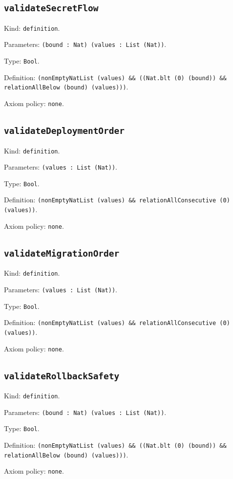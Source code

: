 \documentclass[11pt]{article}
\begin{document}
\subsection*{\texttt{validateSecretFlow}}
\noindent Kind: \texttt{definition}.\par
\noindent Parameters: \texttt{(bound : Nat) (values : List (Nat))}.\par
\noindent Type: \texttt{Bool}.\par
\noindent Definition: \texttt{(nonEmptyNatList (values) \&\& ((Nat.blt (0) (bound)) \&\& relationAllBelow (bound) (values)))}.\par
\noindent Axiom policy: \texttt{none}.\par
\subsection*{\texttt{validateDeploymentOrder}}
\noindent Kind: \texttt{definition}.\par
\noindent Parameters: \texttt{(values : List (Nat))}.\par
\noindent Type: \texttt{Bool}.\par
\noindent Definition: \texttt{(nonEmptyNatList (values) \&\& relationAllConsecutive (0) (values))}.\par
\noindent Axiom policy: \texttt{none}.\par
\subsection*{\texttt{validateMigrationOrder}}
\noindent Kind: \texttt{definition}.\par
\noindent Parameters: \texttt{(values : List (Nat))}.\par
\noindent Type: \texttt{Bool}.\par
\noindent Definition: \texttt{(nonEmptyNatList (values) \&\& relationAllConsecutive (0) (values))}.\par
\noindent Axiom policy: \texttt{none}.\par
\subsection*{\texttt{validateRollbackSafety}}
\noindent Kind: \texttt{definition}.\par
\noindent Parameters: \texttt{(bound : Nat) (values : List (Nat))}.\par
\noindent Type: \texttt{Bool}.\par
\noindent Definition: \texttt{(nonEmptyNatList (values) \&\& ((Nat.blt (0) (bound)) \&\& relationAllBelow (bound) (values)))}.\par
\noindent Axiom policy: \texttt{none}.\par
\end{document}
